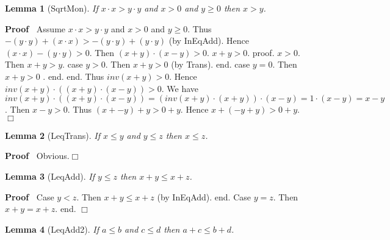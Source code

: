 \documentclass{article}
\newenvironment{forthel}{\begin{leftbar}}{\end{leftbar}}
\newenvironment{proof}{\noindent\textbf{Proof\ }}{\hspace*{\fill}$\Box$\medskip}
\newtheorem{lemma}{Lemma}
\begin{document}
\begin{forthel}
\begin{lemma}[SqrtMon] If $x \cdot x  >  y \cdot y $ and $x  >  0$  and $y  \geq  0 $ then $x > y$.
\end{lemma}\begin{proof}
	Assume $x \cdot x  >  y \cdot y$ and $x > 0$ and $y  \geq  0$. \newline
Thus  $-(y \cdot y) + (x \cdot x)  >  -(y \cdot y) + (y \cdot y)$ (by InEqAdd).\newline 
Hence $(x \cdot x) - (y \cdot y)  >  0$.\newline
Then  $(x + y)  \cdot  (x - y)  >  0$.\newline
$x + y  >  0$.\newline
proof. 	$x  >  0$. Then $x + y  >  y$.\newline
case $y  >  0$. Then $x + y  >  0$ (by Trans). end.\newline
case $y = 0$. Then $x + y   >  0$ . end.\newline
end.\newline
Thus $inv(x + y)  >  0$. Hence $inv(x + y)  \cdot  ((x + y)  \cdot  (x - y))  >  0$.\newline
We have $inv(x + y)  \cdot  ((x + y)  \cdot  (x - y)) 
= (inv(x + y)  \cdot  (x + y))  \cdot  (x - y)
= 1  \cdot  (x - y) = x - y$.\newline
Then $x - y  >  0$.\newline
Thus $(x + -y) + y  >  0 + y$.\newline
Hence $x + (-y + y)  >  0 + y$.\newline
\end{proof}


\begin{lemma}[LeqTrans] If $x \leq y$ and $y \leq z$ then $x \leq z$.

\end{lemma}
\begin{proof}
 	Obvious.\end{proof}



\begin{lemma}[LeqAdd] 	If $y  \leq  z$ then $x + y  \leq  x+z$.

\end{lemma}
\begin{proof}
Case $y  <  z$. Then $x + y  \leq  x + z$ (by InEqAdd). end.\newline
Case $y = z$. Then $x+y = x+z$. end.
\end{proof}


\begin{lemma}[LeqAdd2]  If $a  \leq  b$ and $c  \leq  d$ then $a+c  \leq  b+d$.


\end{lemma}
\end{forthel}
\end{document}
